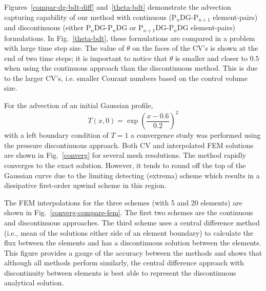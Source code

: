 \documentclass[preprint,authoryear,12pt]{elsarticle}
\newcommand{\PN}[2][error]{P$_{#1}$DG-P$_{#2}$}
\newcommand{\PNDG}[2][error]{P$_{#1}$DG-P$_{#2}$DG}
\begin{document}
Figures~\ref{compar-dg-bdt-diff} and~\ref{theta-bdt} demonstrate the advection capturing capability of our method with continuous (\PN[n]{n+1} element-pairs) and discontinuous (either \PNDG[n]{n} or \PNDG[n+1]{n} element-pairs) formulations. In Fig.~\ref{theta-bdt}, these formulations are compared in a problem with large time step size. The value of $\theta$ on the faces of the CV's is shown at the end of two time steps; it is important to notice that $\theta$ is smaller and closer to $0.5$ when using the continuous approach than the discontinuous method. This is due to the larger CV's, i.e. smaller Courant numbers based on the control volume size.

\medskip
For the advection of an initial Gaussian profile,
\begin{displaymath}
T\left( x,0\right)= \exp{\left( \displaystyle\frac{x-0.6}{0.2} \right)^2}
\end{displaymath} 
with a left boundary condition of $T=1$ a convergence study was performed using the pressure discontinuous approach. Both CV and interpolated FEM solutions are shown in Fig.~\ref{converg} for several mesh resolutions. The method rapidly converges to the exact solution. However, it tends to round off the top of the Gaussian curve due to the limiting detecting (extrema) scheme which results in a dissipative first-order upwind scheme in this region.  

The FEM interpolations for the three schemes (with 5 and 20 elements) are shown in Fig.~\ref{converg-compare-fem}. The first two schemes are the continuous and discontinuous  approaches. The third scheme uses a central difference method (i.e., mean of the solutions either side of an element boundary) to calculate the flux between the elements and has a discontinuous solution between the elements. This figure provides a gauge of the accuracy between the methods and shows that although all methods perform similarly, the central difference approach with discontinuity between elements is best able to represent the discontinuous analytical solution.

\medskip
\end{document}
